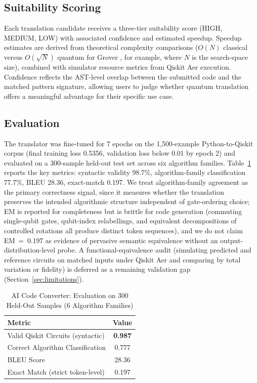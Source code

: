 \documentclass[10pt,conference]{IEEEtran}
\begin{document}
\subsection{Suitability Scoring}

Each translation candidate receives a three-tier suitability score (HIGH, MEDIUM, LOW) with associated confidence and estimated speedup. Speedup estimates are derived from theoretical complexity comparisons ($O(N)$ classical versus $O(\sqrt{N})$ quantum for Grover \cite{grover1996}, for example, where $N$ is the search-space size), combined with simulator resource metrics from Qiskit Aer execution. Confidence reflects the AST-level overlap between the submitted code and the matched pattern signature, allowing users to judge whether quantum translation offers a meaningful advantage for their specific use case.

\subsection{Evaluation}\label{sec:converter-eval}

The translator was fine-tuned for 7 epochs on the 1{,}500-example Python-to-Qiskit corpus (final training loss 0.5356, validation loss below 0.01 by epoch 2) and evaluated on a 300-sample held-out test set across six algorithm families. Table~\ref{tab:converter-eval} reports the key metrics: syntactic validity 98.7\%, algorithm-family classification 77.7\%, BLEU 28.36, exact-match 0.197. We treat algorithm-family agreement as the primary correctness signal, since it measures whether the translation preserves the intended algorithmic structure independent of gate-ordering choice; EM is reported for completeness but is brittle for code generation (commuting single-qubit gates, qubit-index relabellings, and equivalent decompositions of controlled rotations all produce distinct token sequences), and we do not claim EM~=~0.197 as evidence of pervasive semantic equivalence without an output-distribution-level probe. A functional-equivalence audit (simulating predicted and reference circuits on matched inputs under Qiskit Aer and comparing by total variation or fidelity) is deferred as a remaining validation gap (Section~\ref{sec:limitations}).

\begin{table}[htbp]
\caption{AI Code Converter: Evaluation on 300 Held-Out Samples (6 Algorithm Families)}
\label{tab:converter-eval}
\centering
\footnotesize
\begin{tabular}{lc}
\toprule
\textbf{Metric} & \textbf{Value} \\
\midrule
Valid Qiskit Circuits (syntactic) & \textbf{0.987} \\
Correct Algorithm Classification  & 0.777 \\
BLEU Score                        & 28.36 \\
Exact Match (strict token-level)  & 0.197 \\
\bottomrule
\end{tabular}
\end{table}
\end{document}
